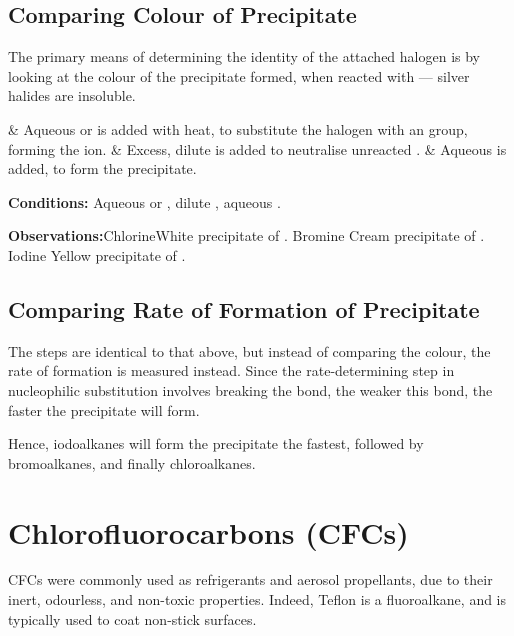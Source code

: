 		\subsection{Comparing Colour of Precipitate}
			The primary means of determining the identity of the attached halogen is by looking at the colour of the precipitate formed, when
			reacted with  --- silver halides are insoluble.

			\begin{numberedlist}
				&	Aqueous  or  is added with heat, to substitute the halogen with an  group, forming the  ion.
				&	Excess, dilute  is added to neutralise unreacted .
				&	Aqueous  is added, to form the  precipitate.
			\end{numberedlist}

			\vspace{1.5em}
			\vbox{\textbf{Conditions:}	\tabto{35mm}Aqueous  or , dilute , aqueous .}

			\vspace{0.75em}
			\vbox{\textbf{Observations:}\tabto{35mm}Chlorine\tabto{60mm}White precipitate of .
										\tabto{35mm}Bromine	\tabto{60mm}Cream precipitate of .
										\tabto{35mm}Iodine	\tabto{60mm}Yellow precipitate of .}

		\subsection{Comparing Rate of Formation of Precipitate}

			The steps are identical to that above, but instead of comparing the colour, the rate of formation is measured instead. Since the
			rate-determining step in nucleophilic substitution involves breaking the  bond, the weaker this bond, the faster the
			precipitate will form.

			Hence, iodoalkanes will form the precipitate the fastest, followed by bromoalkanes, and finally chloroalkanes.



	\pagebreak
	\section{Chlorofluorocarbons (CFCs)}

		CFCs were commonly used as refrigerants and aerosol propellants, due to their inert, odourless, and non-toxic properties.
		Indeed, Teflon is a fluoroalkane, and is typically used to coat non-stick surfaces.

